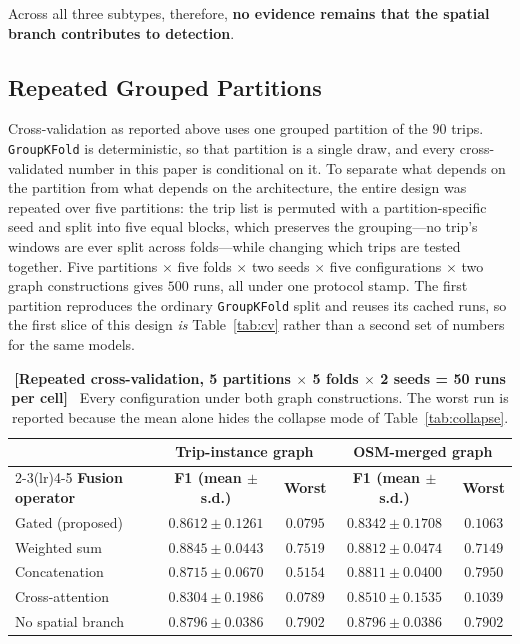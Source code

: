 \documentclass[journal]{IEEEtran}
\begin{document}
Across all three subtypes, therefore, \textbf{no evidence remains that the spatial branch contributes to detection}.

\subsection{Repeated Grouped Partitions}
\label{sec:repeated_cv}
Cross-validation as reported above uses one grouped partition of the 90 trips.
\texttt{GroupKFold} is deterministic, so that partition is a single draw, and
every cross-validated number in this paper is conditional on it. To separate
what depends on the partition from what depends on the architecture, the
entire design was repeated over five partitions: the trip list is permuted
with a partition-specific seed and split into five equal blocks, which
preserves the grouping---no trip's windows are ever split across folds---while
changing which trips are tested together. Five partitions $\times$ five folds
$\times$ two seeds $\times$ five configurations $\times$ two graph
constructions gives $500$ runs, all under one protocol stamp. The first
partition reproduces the ordinary \texttt{GroupKFold} split and reuses its
cached runs, so the first slice of this design \emph{is}
Table~\ref{tab:cv} rather than a second set of numbers for the same models.


\begin{table}[!t]
  \centering
  \caption{\textbf{[Repeated cross-validation, 5 partitions $\times$ 5 folds
  $\times$ 2 seeds = 50 runs per cell]}~ Every configuration under both graph
  constructions. The worst run is reported because the mean alone hides the
  collapse mode of Table~\ref{tab:collapse}.}
  \label{tab:repeated_cv}
  \renewcommand{\arraystretch}{1.2}
  \footnotesize
  \begin{tabular}{@{}lcccc@{}}
    \toprule
    & \multicolumn{2}{c}{\textbf{Trip-instance graph}}
    & \multicolumn{2}{c}{\textbf{OSM-merged graph}} \\
    \cmidrule(lr){2-3}\cmidrule(lr){4-5}
    \textbf{Fusion operator} & \textbf{F1 (mean $\pm$ s.d.)} & \textbf{Worst}
    & \textbf{F1 (mean $\pm$ s.d.)} & \textbf{Worst} \\ \midrule
    Gated (proposed) & $0.8612 \pm 0.1261$ & $0.0795$ & $0.8342 \pm 0.1708$ & $0.1063$ \\
    Weighted sum & $0.8845 \pm 0.0443$ & $0.7519$ & $0.8812 \pm 0.0474$ & $0.7149$ \\
    Concatenation & $0.8715 \pm 0.0670$ & $0.5154$ & $0.8811 \pm 0.0400$ & $0.7950$ \\
    Cross-attention & $0.8304 \pm 0.1986$ & $0.0789$ & $0.8510 \pm 0.1535$ & $0.1039$ \\
    No spatial branch & $0.8796 \pm 0.0386$ & $0.7902$ & $0.8796 \pm 0.0386$ & $0.7902$ \\
    \bottomrule
  \end{tabular}
\end{table}
\end{document}
